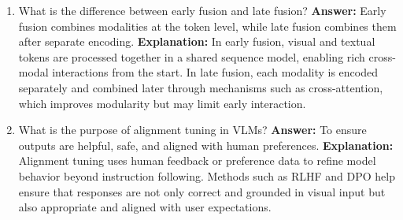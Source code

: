 \documentclass{article}
\begin{document}
\begin{enumerate}
\item What is the difference between early fusion and late fusion?\newline
\textbf{Answer:} Early fusion combines modalities at the token level, while late fusion combines them after separate encoding.\newline
\textbf{Explanation:} In early fusion, visual and textual tokens are processed together in a shared sequence model, enabling rich cross-modal interactions from the start. In late fusion, each modality is encoded separately and combined later through mechanisms such as cross-attention, which improves modularity but may limit early interaction.

\item What is the purpose of alignment tuning in VLMs?\newline
\textbf{Answer:} To ensure outputs are helpful, safe, and aligned with human preferences.\newline
\textbf{Explanation:} Alignment tuning uses human feedback or preference data to refine model behavior beyond instruction following. Methods such as RLHF and DPO help ensure that responses are not only correct and grounded in visual input but also appropriate and aligned with user expectations.

\end{enumerate}
\end{document}
